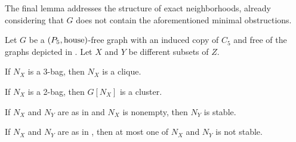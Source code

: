 The final lemma addresses the structure of exact neighborhoods, already
considering that $G$ does not contain the aforementioned minimal obstructions.

\begin{lemma}
    \label{lem:neighborhoods_c5_types}
    Let $G$ be a $\left(P_5,\text{house}\right)$-free graph with an induced copy of $C_5$
    and free of the graphs depicted in .
    Let $X$ and $Y$ be different subsets of $Z$.
    \begin{lemenum}
        \item If $N_X$ is a 3-bag, then $N_X$ is a clique. \label{lem:c5_type_1}
        \item If $N_X$ is a 2-bag, then $G[N_X]$ is a cluster.
            \label{lem:c5_type_2}
        \item If $N_X$ and $N_Y$ are as in  and $N_X$ is
            nonempty, then $N_Y$ is stable. \label{lem:c5_type_3}
        \item If $N_X$ and $N_Y$ are as in , then at most
            one of $N_X$ and $N_Y$ is not stable. \label{lem:c5_type_4}
    \end{lemenum}
\end{lemma}

